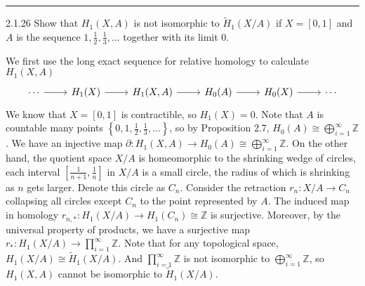 \documentclass[a4paper, 12pt]{article}
\begin{document}
\noindent\rule{7in}{2.8pt}
\begin{problem}{2.1.26}
Show that \(H_1(X,A)\) is not isomorphic to \(\tilde{H}_1(X/A)\) if \(X=[0,1]\) and \(A\) is the sequence \(1,\frac{1}{2},\frac{1}{3},\ldots\) together with its limit \(0\).
\end{problem}
\begin{solution}
We first use the long exact sequence for relative homology to calculate \(H_1(X,A)\)
\[\begin{tikzcd}
	\cdots & {H_1(X)} & {H_1(X,A)} & {H_0(A)} & {H_0(X)} & \cdots
	\arrow[from=1-1, to=1-2]
	\arrow[from=1-2, to=1-3]
	\arrow[from=1-3, to=1-4]
	\arrow[from=1-4, to=1-5]
	\arrow[from=1-5, to=1-6]
\end{tikzcd}\]
We know that \(X=[0,1]\) is contractible, so \(H_1(X)=0\). Note that \(A\) is countable many points \(\left\{ 0,1,\frac{1}{2},\frac{1}{3},\ldots \right\}\), so by Proposition 2.7, \(H_0(A)\cong \bigoplus_{i=1}^\infty \mathbb{Z}\). We have an injective map \(\partial:H_1(X,A)\rightarrow H_0(A)\cong \bigoplus_{i=1}^\infty \mathbb{Z}\). 
On the other hand, the quotient space \(X/A\) is homeomorphic to the shrinking wedge of circles, each interval \([\frac{1}{n+1},\frac{1}{n}]\) in \(X/A\) is a small circle, the radius of which is shrinking as \(n\) gets larger. Denote this circle as \(C_n\). Consider the 
retraction \(r_n:X/A\rightarrow C_n\) collapsing all circles except \(C_n\) to the point represented by \(A\). The induced map in homology \(r_{n,*}:H_1(X/A)\rightarrow H_1(C_n)\cong \mathbb{Z}\) is surjective. Moreover, by the universal property of products, we have a surjective map \(r_*:H_1(X/A)\rightarrow \prod_{i=1}^\infty \mathbb{Z}\). Note that for 
any topological space, \(H_1(X/A)\cong \tilde{H}_1(X/A)\). And \(\prod_{i=1}^\infty \mathbb{Z}\) is not isomorphic to \(\bigoplus_{i=1}^\infty \mathbb{Z}\), so \(H_1(X,A)\) cannot be isomorphic to \(\tilde{H}_1(X/A)\).
\end{solution}
\end{document}
